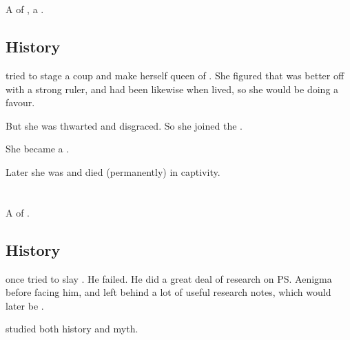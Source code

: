 \section{\Ishicah}
\index{\Ishicah}
A \resvil{} of \TiphredSerah, a \sathariah{}. 









\subsection{History}
\Ishicah{} tried to stage a coup and make herself queen of \TiphredSerah. 
She figured that \CiriathSepher{} was better off with a strong ruler, and \Mystraacht{} had been likewise when \Zachirah{} lived, so she would be doing \TiphredSerah{} a favour. 

But she was thwarted and disgraced. 
So she joined the . 

She became a \Malach.

Later she was  and died (permanently) in captivity. 















\section{\Lothagiel}
\index{\Lothagiel}
A \ketheran{} \resphan{} of \TiphredSerah. 









\subsection{History}
\Lothagiel{} once tried to slay \Ishnaruchaefir{}. 
He failed. 
He did a great deal of research on \ps{\Ishnaruchaefir} Aenigma before facing him, and left behind a lot of useful research notes, which would later be . 

\Lothagiel{} studied both history and myth. 

